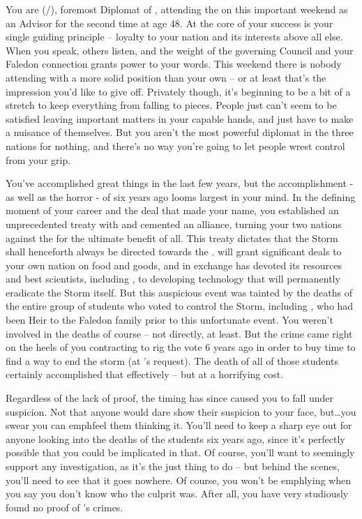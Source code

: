 \documentclass[char]{GL2020}
\begin{document}
\name{\cDiplomat{}}

You are \cDiplomat{} (\cDiplomat{\they}/\cDiplomat{\them}), foremost Diplomat of \pTech{}, attending the \pSchool{} on this important weekend as an Advisor for the second time at age 48.  At the core of your success is your single guiding principle -- loyalty to your nation and its interests above all else. When you speak, others listen, and the weight of the governing Council and your Faledon connection grants power to your words. This weekend there is nobody attending with a more solid position than your own -- or at least that’s the impression you’d like to give off. Privately though, it’s beginning to be a bit of a stretch to keep everything from falling to pieces. People just can’t seem to be satisfied leaving important matters in your capable hands, and just have to make a nuisance of themselves. But you aren’t the most powerful diplomat in the three nations for nothing, and there’s no way you’re going to let people wrest control from your grip.

You’ve accomplished great things in the last few years, but the accomplishment - as well as the horror - of six years ago looms largest in your mind.  In the defining moment of your career and the deal that made your name, you established an unprecedented treaty with \pFarm{} and cemented an alliance, turning your two nations against the \pShip{} for the ultimate benefit of all.  This treaty dictates that the Storm shall henceforth always be directed towards the \pShip{}.  \pFarm{} will grant significant deals to your own nation on food and goods, and in exchange \pTech{} has devoted its resources and best scientists, including \cHeadScientist{}, to developing technology that will permanently eradicate the Storm itself.  But this auspicious event was tainted by the deaths of the entire group of students who voted to control the Storm, including \cHeirSibling{}, who had been Heir to the Faledon family prior to this unfortunate event. You weren’t involved in the deaths of course -- not directly, at least. But the crime came right on the heels of you contracting \cEvil{} to rig the vote 6 years ago in order to buy \cHeadScientist{} time to find a way to end the storm (at \cHeadScientist{}’s request). The death of all of those students certainly accomplished that effectively -- but at a horrifying cost.

Regardless of the lack of proof, the timing has since caused you to fall under suspicion. Not that anyone would dare show their suspicion to your face, but\ldots you swear you can emph{feel} them thinking it. You’ll need to keep a sharp eye out for anyone looking into the deaths of the students six years ago, since it’s perfectly possible that you could be implicated in that. Of course, you’ll want to seemingly support any investigation, as it’s the just thing to do -- but behind the scenes, you’ll need to see that it goes nowhere. Of course, you won’t be emph{lying} when you say you don’t know who the culprit was. After all, you have very studiously found no proof of \cEvil{}’s crimes.
\end{document}
